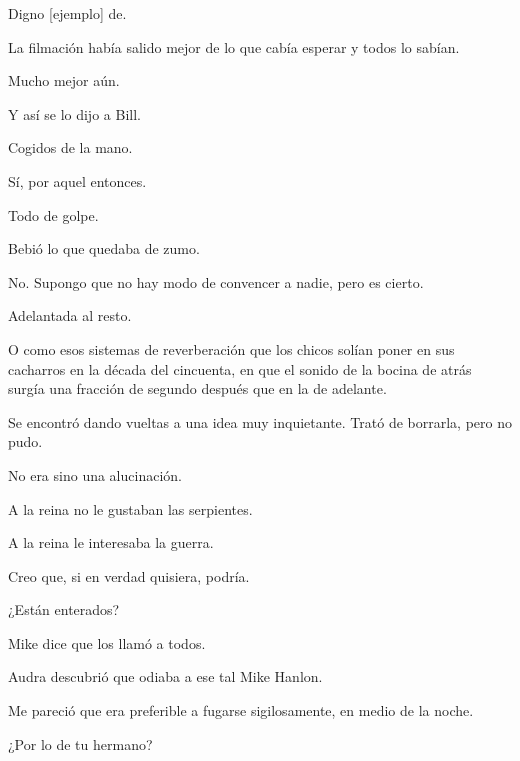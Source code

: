 \sk
Digno [ejemplo] de. 

\sk
La filmación había salido mejor de lo que cabía esperar y todos lo sabían. 

\sk
Mucho mejor aún. 

\sk
Y así se lo dijo a Bill. 

\sk
Cogidos de la mano.\nb{}

\sk
Sí, por aquel entonces. 

\sk
Todo de golpe. 

\sk
Bebió lo que quedaba de zumo. 

\sk
No. Supongo que no hay modo de convencer a nadie, pero es cierto. 

\sk
Adelantada al resto. 

\sk
O como esos sistemas de
reverberación que los chicos solían poner en sus
cacharros en la década del cincuenta, en que el
sonido de la bocina de atrás surgía una fracción de
segundo después que en la de adelante.
\nb{}

\sk
Se encontró dando vueltas a una idea muy inquietante. Trató de borrarla, pero no pudo. 

\sk
No era sino una alucinación. 

\sk
A la reina no le gustaban las serpientes.\nb{}

\sk
A la reina le interesaba la guerra.\nb{}

\sk
 Creo que, si en verdad quisiera, podría. 

\sk
¿Están enterados? 

\sk
Mike dice que los llamó a todos. 

\sk
Audra descubrió que odiaba a ese tal Mike Hanlon. 

\sk
Me
pareció que era preferible a fugarse sigilosamente, en medio de la noche. 

\sk
¿Por lo de tu hermano? 

